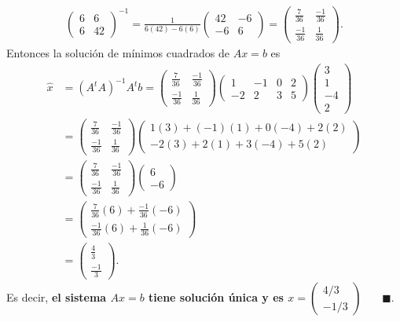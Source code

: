 \documentclass[11pt,letterpaper]{article}
\newcommand{\fin}{$\blacksquare.$}
\begin{document}
\begin{itemize}
\begin{align*}
\begin{pmatrix}
6 & 6 \\
6 & 42
\end{pmatrix}^{-1} = \frac{1}{6(42)-6(6)}\begin{pmatrix}
42 & -6\\
-6 & 6
\end{pmatrix}=\left(\begin{matrix}
\frac{7}{36} & \frac{-1}{36} \\
\frac{-1}{36} & \frac{1}{36}
\end{matrix}\right).
\end{align*}
Entonces la solución de mínimos cuadrados de $Ax=b$ es
\begin{align*}
\hat{x}& = (A^tA)^{-1} A^tb = \left(\begin{matrix}
\frac{7}{36} & \frac{-1}{36} \\
\frac{-1}{36} & \frac{1}{36}
\end{matrix}\right) \begin{pmatrix}
1 & -1 & 0 & 2 \\
-2 & 2 & 3 & 5
\end{pmatrix}\begin{pmatrix}
3\\ 1\\ -4\\2 
\end{pmatrix}\\
&= \left(\begin{matrix}
\frac{7}{36} & \frac{-1}{36} \\
\frac{-1}{36} & \frac{1}{36}
\end{matrix}\right) \left(\begin{matrix}
1(3)+\left(-1\right)(1)+0\left(-4\right)+2(2) \\
-2(3)+2(1)+3\left(-4\right)+5(2)
\end{matrix}\right) \\
&= \left(\begin{matrix}
\frac{7}{36} & \frac{-1}{36} \\
\frac{-1}{36} & \frac{1}{36}
\end{matrix}\right) \begin{pmatrix}
6\\-6
\end{pmatrix}\\
&=\left(\begin{matrix}
\frac{7}{36}(6)+\frac{-1}{36}\left(-6\right) \\
\frac{-1}{36}(6)+\frac{1}{36}\left(-6\right)
\end{matrix}\right) \\
&=\left(\begin{matrix}
\frac{4}{3} \\
\frac{-1}{3}
\end{matrix}\right).
\end{align*}
Es decir, \textbf{el sistema $Ax=b$ tiene solución única y es $x=\left(\begin{matrix}
4/3 \\
-1/3
\end{matrix}\right)$} \ \ \ \fin



\end{itemize}
\end{document}
